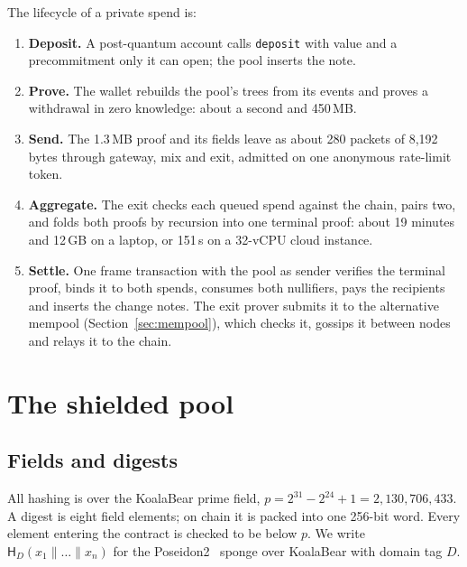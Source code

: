 \documentclass[11pt,a4paper]{article}
\newcommand{\code}[1]{\texttt{\small #1}}
\newcommand{\Hf}{\mathsf{H}}
\begin{document}
\noindent The lifecycle of a private spend is:
\begin{enumerate}
  \item \textbf{Deposit.} A post-quantum account calls \code{deposit} with value and a precommitment
    only it can open; the pool inserts the note.
  \item \textbf{Prove.} The wallet rebuilds the pool's trees from its events and proves a withdrawal in
    zero knowledge: about a second and 450\,MB.
  \item \textbf{Send.} The 1.3\,MB proof and its fields leave as about 280 packets of 8,192 bytes through
    gateway, mix and exit, admitted on one anonymous rate-limit token.
  \item \textbf{Aggregate.} The exit checks each queued spend against the chain, pairs two, and folds
    both proofs by recursion into one terminal proof: about 19 minutes and 12\,GB on a laptop, or
    151\,s on a 32-vCPU cloud instance.
  \item \textbf{Settle.} One frame transaction with the pool as sender verifies the terminal proof,
    binds it to both spends, consumes both nullifiers, pays the recipients and inserts the change notes.
    The exit prover submits it to the alternative mempool (Section~\ref{sec:mempool}), which checks it,
    gossips it between nodes and relays it to the chain.
\end{enumerate}

\section{The shielded pool}\label{sec:pool}

\subsection{Fields and digests}
All hashing is over the KoalaBear prime field, $p = 2^{31} - 2^{24} + 1 = 2{,}130{,}706{,}433$. A digest
is eight field elements; on chain it is packed into one 256-bit word. Every element entering the
contract is checked to be below $p$. We write $\Hf_D(x_1 \| \dots \| x_n)$ for the Poseidon2~\cite{poseidon2}
sponge over KoalaBear with domain tag $D$.
\end{document}
